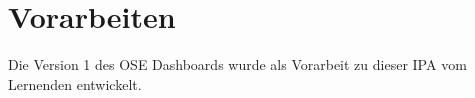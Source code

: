 \section{Vorarbeiten}
Die Version 1 des OSE Dashboards wurde als Vorarbeit zu dieser IPA vom Lernenden entwickelt.
